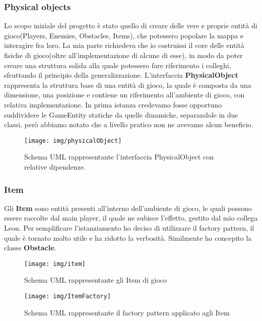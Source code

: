 \subsubsection{Physical objects}
Lo scopo iniziale del progetto è stato quello di creare delle vere e proprie entità di gioco(Players, Enemies, Obstacles, Items), che potessero popolare la mappa e interagire fra loro.
La mia parte richiedeva che io costruissi il core delle entità fisiche di gioco(oltre all'implementazione di alcune di esse), in modo da poter creare una struttura solida alla quale potessero fare riferimento i colleghi, sfruttando il principio della generalizzazione.
L'interfaccia \textbf{PhysicalObject} rappresenta la struttura base di una entità di gioco, la quale è composta da una dimensione, una posizione e contiene un riferimento all'ambiente di gioco, con relativa implementazione. In prima istanza credevamo fosse opportuno suddividere le GameEntity statiche da quelle dinamiche, separandole in due classi, però abbiamo notato che a livello pratico non ne avevamo alcun beneficio. 

\begin{figure}[H]
	\centering{}
	\texttt{[image: img/physicalObject]}
	\label{img:physicalObject}
	\caption{Schema UML rappresentante l'interfaccia PhysicalObject con relative dipendenze. \\}
\end{figure}

\newpage

\subsubsection{Item}
Gli \textbf{Item} sono entità presenti all'interno dell'ambiente di gioco, le quali possono essere raccolte dal main player, il quale ne subisce l'effetto, gestito dal mio collega Leon.
Per semplificare l'istanziamento ho deciso di utilizzare il factory pattern, il quale è tornato molto utile e ha ridotto la verbosità. Similmente ho concepito la classe \textbf{Obstacle}.

\begin{figure}[H]
	\centering{}
	\texttt{[image: img/item]}
	\label{img:item.png}
	\caption{Schema UML rappresentante gli Item di gioco\\}
\end{figure}

\begin{figure}[H]
	\centering{}
	\texttt{[image: img/ItemFactory]}
	\label{img:ItemFactory.png}
	\caption{Schema UML rappresentante il factory pattern applicato agli Item\\}
\end{figure}

